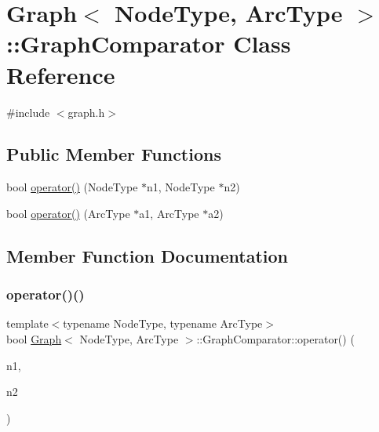 \hypertarget{classGraph_1_1GraphComparator}{}\section{Graph$<$ Node\+Type, Arc\+Type $>$\+:\+:Graph\+Comparator Class Reference}
\label{classGraph_1_1GraphComparator}


{\ttfamily \#include $<$graph.\+h$>$}

\subsection*{Public Member Functions}
\begin{DoxyCompactItemize}
\item 
bool \mbox{\hyperlink{classGraph_1_1GraphComparator_a552ad490f32a7f7df191edb78b73d253}{operator()}} (Node\+Type $\ast$n1, Node\+Type $\ast$n2)
\item 
bool \mbox{\hyperlink{classGraph_1_1GraphComparator_a28620cbf8e7ac3f3a2d623a2158c1898}{operator()}} (Arc\+Type $\ast$a1, Arc\+Type $\ast$a2)
\end{DoxyCompactItemize}


\subsection{Member Function Documentation}
\mbox{\label{classGraph_1_1GraphComparator_a552ad490f32a7f7df191edb78b73d253}} 
\subsubsection{\texorpdfstring{operator()()}{operator()()}\hspace{0.1cm}{\footnotesize\ttfamily [1/2]}}
{\footnotesize\ttfamily template$<$typename Node\+Type, typename Arc\+Type$>$ \\
bool \mbox{\hyperlink{classGraph}{Graph}}$<$ Node\+Type, Arc\+Type $>$\+::Graph\+Comparator\+::operator() (\begin{DoxyParamCaption}\item[{Node\+Type $\ast$}]{n1,  }\item[{Node\+Type $\ast$}]{n2 }\end{DoxyParamCaption})\hspace{0.3cm}{\ttfamily [inline]}}

